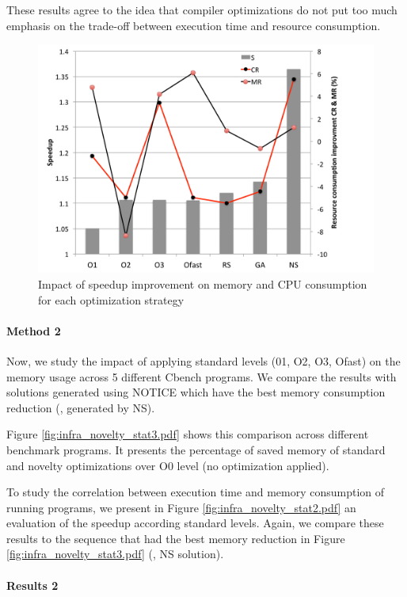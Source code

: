 These results agree to the idea that compiler optimizations do not put too much emphasis on the trade-off between execution time and resource consumption.


\begin{figure}[h]
		\centering
		\includegraphics[width=0.9\linewidth]{chapitre3/fig/rq3.pdf}
		\caption{Impact of speedup improvement on memory and CPU consumption for each optimization strategy}
		\label{fig:rq3.pdf}
\end{figure}


\paragraph{Method 2}

Now, we study the impact of applying standard levels (01, O2, O3, Ofast) on the memory usage across 5 different Cbench programs. We compare the results with solutions generated using NOTICE which have the best memory consumption reduction (\ie, generated by NS). 

Figure \ref{fig:infra_novelty_stat3.pdf} shows this comparison across different benchmark programs. It presents the percentage of saved memory of standard and novelty optimizations over O0 level (no optimization applied).

To study the correlation between execution time and memory consumption of running programs, we present in Figure \ref{fig:infra_novelty_stat2.pdf} an evaluation of the speedup according standard levels. Again, we compare these results to the sequence that had the best memory reduction in Figure \ref{fig:infra_novelty_stat3.pdf} (\ie, NS solution). 

\paragraph{Results 2}


